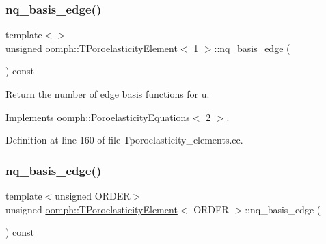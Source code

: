 \subsubsection{\texorpdfstring{nq\+\_\+basis\+\_\+edge()}{nq\_basis\_edge()}\hspace{0.1cm}{\footnotesize\ttfamily [2/3]}}
{\footnotesize\ttfamily template$<$$>$ \\
unsigned \hyperlink{classoomph_1_1TPoroelasticityElement}{oomph\+::\+T\+Poroelasticity\+Element}$<$ 1 $>$\+::nq\+\_\+basis\+\_\+edge (\begin{DoxyParamCaption}{ }\end{DoxyParamCaption}) const\hspace{0.3cm}{\ttfamily [virtual]}}



Return the number of edge basis functions for u. 



Implements \hyperlink{classoomph_1_1PoroelasticityEquations_a81b78261be29e506dc70a59c2925c061}{oomph\+::\+Poroelasticity\+Equations$<$ 2 $>$}.



Definition at line 160 of file Tporoelasticity\+\_\+elements.\+cc.

\mbox{\label{classoomph_1_1TPoroelasticityElement_a65dd05b91f2953a7229042a4cf95257b}} 
\subsubsection{\texorpdfstring{nq\+\_\+basis\+\_\+edge()}{nq\_basis\_edge()}\hspace{0.1cm}{\footnotesize\ttfamily [3/3]}}
{\footnotesize\ttfamily template$<$unsigned O\+R\+D\+ER$>$ \\
unsigned \hyperlink{classoomph_1_1TPoroelasticityElement}{oomph\+::\+T\+Poroelasticity\+Element}$<$ O\+R\+D\+ER $>$\+::nq\+\_\+basis\+\_\+edge (\begin{DoxyParamCaption}{ }\end{DoxyParamCaption}) const\hspace{0.3cm}{\ttfamily [virtual]}}



